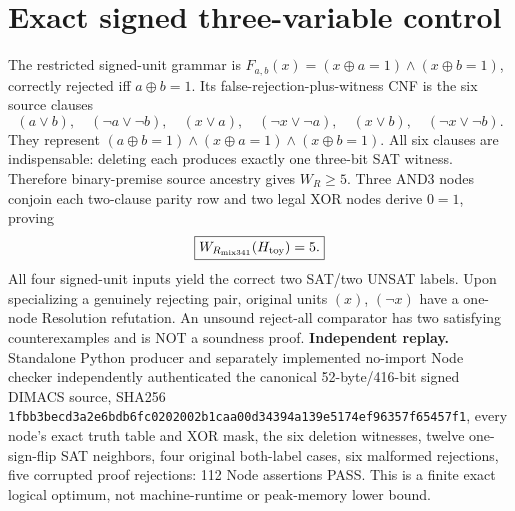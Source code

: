 \documentclass[11pt]{article}
\begin{document}
\section*{Exact signed three-variable control}
The restricted signed-unit grammar is $F_{a,b}(x)=(x\oplus a=1)\wedge(x\oplus b=1)$, correctly rejected iff $a\oplus b=1$. Its false-rejection-plus-witness CNF is the six source clauses
\[
(a\vee b),\quad(\neg a\vee\neg b),\quad(x\vee a),\quad
(\neg x\vee\neg a),\quad(x\vee b),\quad(\neg x\vee\neg b).
\]
They represent $(a\oplus b=1)\wedge(x\oplus a=1)\wedge(x\oplus b=1)$. All six clauses are indispensable: deleting each produces exactly one three-bit SAT witness. Therefore binary-premise source ancestry gives $W_R\ge5$. Three AND3 nodes conjoin each two-clause parity row and two legal XOR nodes derive $0=1$, proving
\[
\boxed{W_{R_{\mathrm{mix341}}}(H_{\rm toy})=5.}
\]
All four signed-unit inputs yield the correct two SAT/two UNSAT labels. Upon specializing a genuinely rejecting pair, original units $(x)$, $(\neg x)$ have a one-node Resolution refutation. An unsound reject-all comparator has two satisfying counterexamples and is NOT a soundness proof.
\noindent\textbf{Independent replay.} Standalone Python producer and separately implemented no-import Node checker independently authenticated the canonical 52-byte/416-bit signed DIMACS source, SHA256 \texttt{1fbb3becd3a2e6bdb6fc0202002b1caa00d34394a139e5174ef96357f65457f1}, every node's exact truth table and XOR mask, the six deletion witnesses, twelve one-sign-flip SAT neighbors, four original both-label cases, six malformed rejections, five corrupted proof rejections: 112 Node assertions PASS. This is a finite exact logical optimum, not machine-runtime or peak-memory lower bound.
\end{document}
